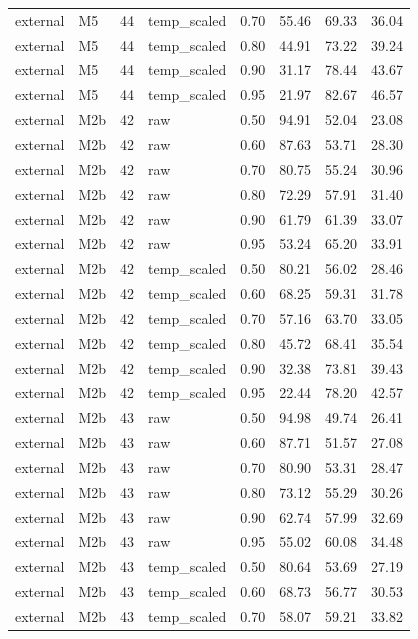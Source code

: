 \begin{tabular}{llrlrrrr}
external & M5 & 44 & temp\_scaled & 0.70 & 55.46 & 69.33 & 36.04 \\
external & M5 & 44 & temp\_scaled & 0.80 & 44.91 & 73.22 & 39.24 \\
external & M5 & 44 & temp\_scaled & 0.90 & 31.17 & 78.44 & 43.67 \\
external & M5 & 44 & temp\_scaled & 0.95 & 21.97 & 82.67 & 46.57 \\
external & M2b & 42 & raw & 0.50 & 94.91 & 52.04 & 23.08 \\
external & M2b & 42 & raw & 0.60 & 87.63 & 53.71 & 28.30 \\
external & M2b & 42 & raw & 0.70 & 80.75 & 55.24 & 30.96 \\
external & M2b & 42 & raw & 0.80 & 72.29 & 57.91 & 31.40 \\
external & M2b & 42 & raw & 0.90 & 61.79 & 61.39 & 33.07 \\
external & M2b & 42 & raw & 0.95 & 53.24 & 65.20 & 33.91 \\
external & M2b & 42 & temp\_scaled & 0.50 & 80.21 & 56.02 & 28.46 \\
external & M2b & 42 & temp\_scaled & 0.60 & 68.25 & 59.31 & 31.78 \\
external & M2b & 42 & temp\_scaled & 0.70 & 57.16 & 63.70 & 33.05 \\
external & M2b & 42 & temp\_scaled & 0.80 & 45.72 & 68.41 & 35.54 \\
external & M2b & 42 & temp\_scaled & 0.90 & 32.38 & 73.81 & 39.43 \\
external & M2b & 42 & temp\_scaled & 0.95 & 22.44 & 78.20 & 42.57 \\
external & M2b & 43 & raw & 0.50 & 94.98 & 49.74 & 26.41 \\
external & M2b & 43 & raw & 0.60 & 87.71 & 51.57 & 27.08 \\
external & M2b & 43 & raw & 0.70 & 80.90 & 53.31 & 28.47 \\
external & M2b & 43 & raw & 0.80 & 73.12 & 55.29 & 30.26 \\
external & M2b & 43 & raw & 0.90 & 62.74 & 57.99 & 32.69 \\
external & M2b & 43 & raw & 0.95 & 55.02 & 60.08 & 34.48 \\
external & M2b & 43 & temp\_scaled & 0.50 & 80.64 & 53.69 & 27.19 \\
external & M2b & 43 & temp\_scaled & 0.60 & 68.73 & 56.77 & 30.53 \\
external & M2b & 43 & temp\_scaled & 0.70 & 58.07 & 59.21 & 33.82 \\

\end{tabular}
